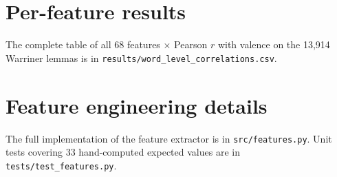\documentclass{article}
\begin{document}

\newpage
\appendix

\section{Per-feature results}

The complete table of all 68 features × Pearson $r$ with valence on the 13,914 Warriner lemmas is in \texttt{results/word\_level\_correlations.csv}.

\section{Feature engineering details}

The full implementation of the feature extractor is in \texttt{src/features.py}. Unit tests covering 33 hand-computed expected values are in \texttt{tests/test\_features.py}.
\end{document}
